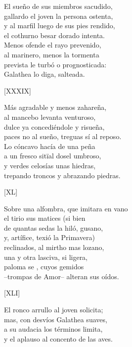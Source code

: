 \documentclass[11pt,a4paper,twoside]{article}
\begin{document}
El sueño de sus miembros sacudido,\\
gallardo el joven la persona ostenta,\\
y al marfil luego de sus pies rendido,\\
el cothurno besar dorado intenta.\\
Menos ofende el rayo prevenido,\\
al marinero, menos la tormenta\\
prevista le turbó o prognosticada:\\
Galathea lo diga, salteada.\par\pend 
%
\begin{center}
	[XXXIX]
\end{center}\pstart
Más agradable y menos zahareña,\\
al mancebo levanta venturoso,\\
dulce ya concediéndole y risueña,\\
paces no al sueño, treguas sí al reposo.\\
Lo cóncavo hacía de una peña\\
a un fresco sitïal dosel umbroso,\\
y verdes celosías unas hiedras,\\
trepando troncos y abrazando piedras.\par\pend
\relax
\vfill
\newpage
%
\begin{center}
	[XL]
\end{center}\pstart
Sobre una alfombra, que imitara en vano\\
el tirio sus matices (si bien \\
de quantas sedas la hiló, gusano,\\
y, artífice, texió la Primavera)\\
reclinados, al mirtho mas lozano,\\
una y otra lasciva, si ligera,\\
paloma se , cuyos gemidos\\
--trompas de Amor-- alteran sus oídos.\par\pend
%
\begin{center}
	[XLI]
\end{center}\pstart
El ronco arrullo al joven solicita;\\
mas, con desvíos Galathea suaves,\\
a su audacia los términos limita,\\
y el aplauso al concento de las aves.\\
\end{document}
